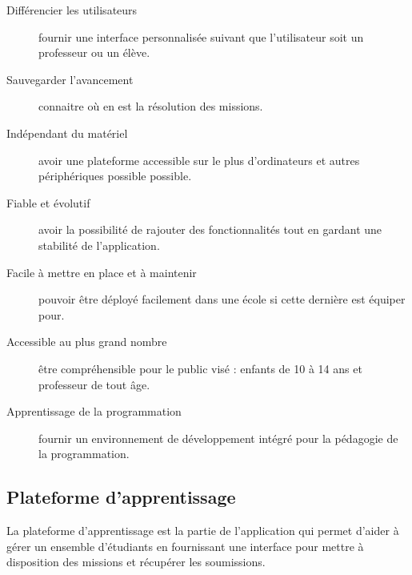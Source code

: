 \begin{description}
  \item[Différencier les utilisateurs] fournir une interface personnalisée suivant que l'utilisateur soit un professeur ou un élève.
  \item[Sauvegarder l'avancement] connaitre où en est la résolution des missions.
  \item[Indépendant du matériel] avoir une plateforme accessible sur le plus d'ordinateurs et autres périphériques possible possible.
  \item[Fiable et évolutif] avoir la possibilité de rajouter des fonctionnalités tout en gardant une stabilité de l'application.
  \item[Facile à mettre en place et à maintenir] pouvoir être déployé facilement dans une école si cette dernière est équiper pour.
  \item[Accessible au plus grand nombre] être compréhensible pour le public visé : enfants de 10 à 14 ans et professeur de tout âge.
  \item[Apprentissage de la programmation] fournir un environnement de développement intégré pour la pédagogie de la programmation.
\end{description}

\subsection{Plateforme d'apprentissage}
La plateforme d'apprentissage est la partie de l'application qui permet d'aider à gérer un ensemble d'étudiants en fournissant une interface pour mettre à disposition des missions et récupérer les soumissions.

